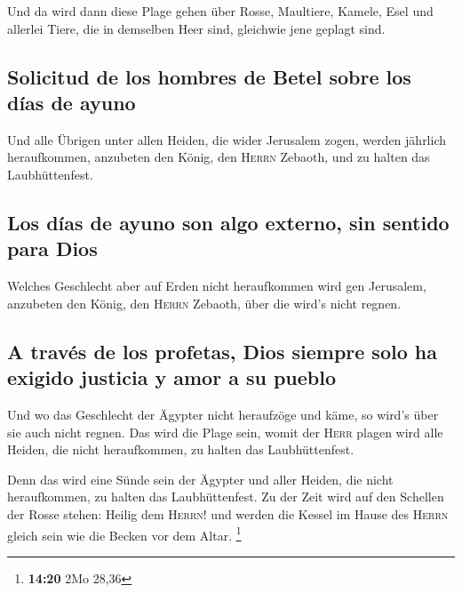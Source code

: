  Und da wird dann diese Plage gehen über Rosse,
Maultiere, Kamele, Esel und allerlei Tiere, die in demselben Heer sind,
gleichwie jene geplagt sind.

\hypertarget{solicitud-de-los-hombres-de-betel-sobre-los-duxedas-de-ayuno}{%
\subsection{Solicitud de los hombres de Betel sobre los días de
ayuno}\label{solicitud-de-los-hombres-de-betel-sobre-los-duxedas-de-ayuno}}

 Und alle Übrigen unter allen Heiden, die wider Jerusalem
zogen, werden jährlich heraufkommen, anzubeten den König, den
\textsc{Herrn} Zebaoth, und zu halten das Laubhüttenfest.

\hypertarget{los-duxedas-de-ayuno-son-algo-externo-sin-sentido-para-dios}{%
\subsection{Los días de ayuno son algo externo, sin sentido para
Dios}\label{los-duxedas-de-ayuno-son-algo-externo-sin-sentido-para-dios}}

 Welches Geschlecht aber auf Erden nicht heraufkommen
wird gen Jerusalem, anzubeten den König, den \textsc{Herrn} Zebaoth,
über die wird's nicht regnen.

\hypertarget{a-travuxe9s-de-los-profetas-dios-siempre-solo-ha-exigido-justicia-y-amor-a-su-pueblo}{%
\subsection{A través de los profetas, Dios siempre solo ha exigido
justicia y amor a su
pueblo}\label{a-travuxe9s-de-los-profetas-dios-siempre-solo-ha-exigido-justicia-y-amor-a-su-pueblo}}

 Und wo das Geschlecht der Ägypter nicht heraufzöge und
käme, so wird's über sie auch nicht regnen. Das wird die Plage sein,
womit der \textsc{Herr} plagen wird alle Heiden, die nicht heraufkommen,
zu halten das Laubhüttenfest.

 Denn das wird eine Sünde sein der Ägypter und aller
Heiden, die nicht heraufkommen, zu halten das Laubhüttenfest.
 Zu der Zeit wird auf den Schellen der Rosse stehen:
Heilig dem \textsc{Herrn}! und werden die Kessel im Hause des
\textsc{Herrn} gleich sein wie die Becken vor dem Altar. \footnote{\textbf{14:20}
  2Mo 28,36}

